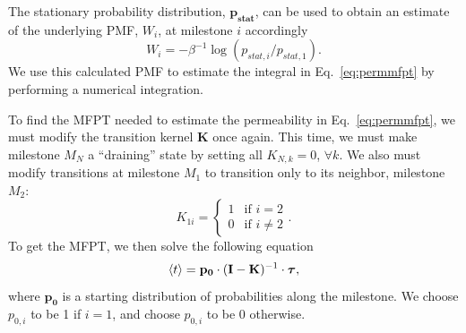         \par The stationary probability distribution, $\mathbf{p_{stat}}$, can be used to obtain an estimate of the underlying PMF, $W_i$, at milestone $i$ accordingly
        \begin{equation}
            W_i = -\beta^{-1}\log(p_{stat,i}/p_{stat,1}).
        \end{equation}
        We use this calculated PMF to estimate the integral in Eq.~\ref{eq:permmfpt} by performing a numerical integration.

        \par To find the MFPT needed to estimate the permeability in Eq.~\ref{eq:permmfpt}, we must modify the transition kernel $\mathbf{K}$ once again. This time, we must make milestone $M_N$ a ``draining'' state by setting all $K_{N, k} = 0$, $\forall k$. We also must modify transitions at milestone $M_1$ to transition only to its neighbor, milestone $M_2$:
        \begin{equation}
            K_{1i} = \begin{cases}
                1 & \text{if } i = 2\\
                0 & \text{if } i \neq 2
            \end{cases}.
        \end{equation}
        To get the MFPT, we then solve the following equation
        \begin{equation}
                \langle t\rangle = \mathbf{p_0} \cdot (\mathbf{I}-\mathbf{K})^{-1} \cdot \boldsymbol{\tau},
        \end{equation}
        where $\mathbf{p_0}$ is a starting distribution of probabilities along the milestone. We choose $p_{0,i}$  to be 1 if $i = 1$, and choose $p_{0,i}$ to be 0 otherwise.

